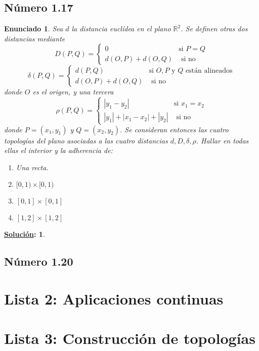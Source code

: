 \documentclass[10pt,a4paper,openright]{book}
\theoremstyle{break}
\newtheorem*{enun}{Enunciado}
\newtheorem*{sol}{\underline{Solución}:}
\begin{document}
\section*{Número 1.17}
\begin{enun}
Sea $d$ la distancia euclídea en el plano $\mathbb{R}^2$. Se definen otras dos distancias mediante $$D(P,Q) = \begin{cases} 0 & \mbox{si } P = Q \\ d(O,P) + d(O,Q) & \mbox{ si no} \end{cases}$$
$$\delta(P,Q) = \begin{cases} d(P,Q) & \mbox{si } O,P \mbox{ y } Q \mbox{ están alineados} \\ d(O,P) + d(O,Q) & \mbox{ si no} \end{cases}$$
donde $O$ es el origen, y una tercera 
$$\rho(P,Q) = \begin{cases} |y_1 - y_2| & \mbox{si } x_1 = x_2  \\ |y_1| + |x_1 - x_2| + |y_2| & \mbox{ si no}\end{cases}$$
donde $P = (x_1,y_1)$ y $Q = (x_2,y_2)$. Se consideran entonces las cuatro topologías del plano asociadas a las cuatro distancias $d,D,\delta,\rho$. Hallar en todas ellas el interior y la adherencia de:
\begin{enumerate}[label={(\arabic*)}]
\item Una recta.
\item $[0,1) \times [0,1)$
\item $[0,1] \times [0,1]$
\item $[1,2] \times [1,2]$
\end{enumerate}
\end{enun}

\begin{sol}
\end{sol}

\section*{\Lightning Número 1.20}
\chapter{Lista 2: Aplicaciones continuas}%
\label{cha:lista2}

\chapter{Lista 3: Construcción de topologías}%
\label{cha:lista3}
\end{document}
